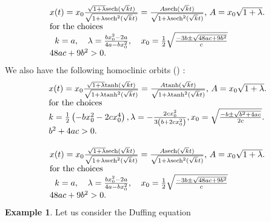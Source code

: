 \documentclass{ws-ijbc}
\begin{document}
\[
\]%
\begin{equation}
\begin{tabular}{l}
$x(t)=x_{0}\frac{\sqrt{1+\lambda }\text{sech}(\sqrt{k}t)}{\sqrt{1+\lambda 
\text{sech}^{2}(\sqrt{k}t)}}=\frac{A\text{sech}(\sqrt{k}t)}{\sqrt{1+\lambda 
\text{sech}^{2}(\sqrt{k}t)}}$, $A=x_{0}\sqrt{1+\lambda }.$ \\ 
for the choices \\ 
\begin{tabular}{lll}
$k=a,$ & $\lambda =\frac{bx_{0}^{2}-2a}{4a-bx_{0}^{2}},$ & $x_{0}=\frac{1}{2}%
\sqrt{\frac{-3b\pm \sqrt{48ac+9b^{2}}}{c}}$%
\end{tabular}
\\ 
$48ac+9b^{2}>0.$%
\end{tabular}
\label{x6a1}
\end{equation}%
We also have the following homoclinic orbits (\cite{Milinkov63}) : 
\begin{equation}
\begin{tabular}{l}
$x(t)=x_{0}\frac{\sqrt{1+\lambda }\text{tanh}(\sqrt{k}t)}{\sqrt{1+\lambda 
\text{tanh}^{2}(\sqrt{k}t)}}=\frac{A\text{tanh}(\sqrt{k}t)}{\sqrt{1+\lambda 
\text{tanh}^{2}(\sqrt{k}t)}}$, $A=x_{0}\sqrt{1+\lambda }.$ \\ 
for the choices \\ 
$k=\frac{1}{2}\left( -bx_{0}^{2}-2cx_{0}^{4}\right) ,\lambda =-\frac{%
2cx_{0}^{2}}{3\left( b+2cx_{0}^{2}\right) },x_{0}=\sqrt{\frac{-b\pm \sqrt{%
b^{2}+4ac}}{2c}}.$ \\ 
$b^{2}+4ac>0.$%
\end{tabular}
\label{x6a2}
\end{equation}%
\[
\]%
\begin{equation}
\begin{tabular}{l}
$x(t)=x_{0}\frac{\sqrt{1+\lambda }\text{sech}(\sqrt{k}t)}{\sqrt{1+\lambda 
\text{sech}^{2}(\sqrt{k}t)}}=\frac{A\text{sech}(\sqrt{k}t)}{\sqrt{1+\lambda 
\text{sech}^{2}(\sqrt{k}t)}}$, $A=x_{0}\sqrt{1+\lambda }.$ \\ 
for the choices \\ 
\begin{tabular}{lll}
$k=a,$ & $\lambda =\frac{bx_{0}^{2}-2a}{4a-bx_{0}^{2}},$ & $x_{0}=\frac{1}{2}%
\sqrt{\frac{-3b\pm \sqrt{48ac+9b^{2}}}{c}}$%
\end{tabular}
\\ 
$48ac+9b^{2}>0.$%
\end{tabular}
\label{x7}
\end{equation}%
\textbf{Example 1}. Let us consider the Duffing equation%
\end{document}
